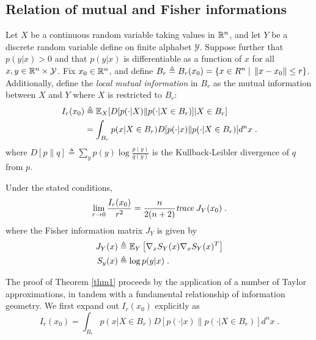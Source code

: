 
\subsection*{Relation of mutual and Fisher informations}
	Let $X$ be a continuous random variable taking values in $\mathbb{R}^n$, and let $Y$ be a discrete random variable define on finite alphabet $\mathcal{Y}$. Suppose further that $p(y|x) > 0$ and that $p(y|x)$ is differentiable as a function of $x$ for all $x,y \in \mathbb{R}^n \times \mathcal{Y}$. Fix $x_0 \in \mathbb{R}^n$, and define $B_r \triangleq B_r(x_0) = \{ x \in R^n \;|\; \left\lVert x - x_0\right\rVert \leq r \}$. Additionally, define the \emph{local mutual information} in $B_r$ as the mutual information between $X$ and $Y$ where $X$ is restricted to $B_r$:
	\begin{align}
		I_r(x_0) &\triangleq \mathbb{E}_X[D[p(\cdot|X)\| p(\cdot|X \in B_r)]|X \in B_r] \\
		&= \int_{B_r} p(x|X \in B_r) D[p(\cdot|x)\| p(\cdot|X \in B_r)] d^n x\;.
	\end{align}
	where $D[p\|q] \triangleq \sum_{y} p(y) \log \frac{p(y)}{q(y)}$ is the Kullback-Leibler divergence of $q$ from $p$. 

	\begin{thm} \label{thm1}
		Under the stated conditions, 
		\begin{equation}
			\lim_{r\rightarrow 0} \frac{I_r(x_0)}{r^2} = \frac{n}{2(n+2)} \emph{trace}\; J_Y(x_0)\;.
		\end{equation}
		where the Fisher information matrix $J_Y$ is given by 
		\begin{align}
		J_Y(x) &\triangleq \mathbb{E}_Y\left[\nabla_x S_{Y}(x)\nabla_x S_{Y}(x)^T \right] \\
		S_y(x) &\triangleq \log p(y|x)\;.
	\end{align}
	\end{thm}

	The proof of Theorem \ref{thm1} proceeds by the application of a number of Taylor approximations, in tandem with a fundamental relationship of information geometry. We first expand out $I_r(x_0)$ explicitly as
	\begin{equation}
		I_r(x_0) = \int_{B_r} p(x|X \in B_r) D[p(\cdot|x)\| p(\cdot|X \in B_r)] d^n x\;. \label{eq:explicit}
	\end{equation}

